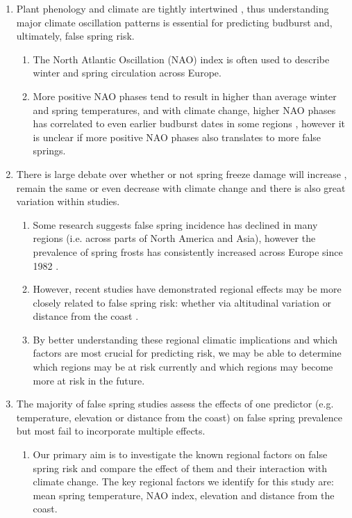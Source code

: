 \documentclass{article}\usepackage[]{graphicx}\usepackage[]{color}
\begin{document}
\begin{enumerate}
\item Plant phenology and climate are tightly intertwined \citep{Wolkovich2011}, thus understanding major climate oscillation patterns is essential for predicting budburst and, ultimately, false spring risk.  
\begin{enumerate}
\item The North Atlantic Oscillation (NAO) index is often used to describe winter and spring circulation across Europe. %
\item More positive NAO phases tend to result in higher than average winter and spring temperatures, and with climate change, higher NAO phases has correlated to even earlier budburst dates in some regions \citep{Chmielewski2001}, however it is unclear if more positive NAO phases also translates to more false springs.
\end{enumerate}

\item There is large debate over whether or not spring freeze damage will increase \citep{Hannenin1991, Augspurger2013, Labe2016}, remain the same \citep{Scheifinger2003} or even decrease \citep{Kramer1994, Vitra2017} with climate change and there is also great variation within studies. %
\begin{enumerate}
\item Some research suggests false spring incidence has declined in many regions (i.e. across parts of North America and Asia), however the prevalence of spring frosts has consistently increased across Europe since 1982 \citep{Liu2018}.
\item However, recent studies have demonstrated regional effects may be more closely related to false spring risk: whether via altitudinal variation \citep{Vitra2017, Ma2018} or distance from the coast \citep{Wypych2016a, Ma2018}.
\item By better understanding these regional climatic implications and which factors are most crucial for predicting risk, we may be able to determine which regions may be at risk currently and which regions may become more at risk in the future.
\end{enumerate}

\item The majority of false spring studies assess the effects of one predictor (e.g. temperature, elevation or distance from the coast) on false spring prevalence but most fail to incorporate multiple effects. 
\begin{enumerate}
\item Our primary aim is to investigate the known regional factors on false spring risk and compare the effect of them and their interaction with climate change. The key regional factors we identify for this study are: mean spring temperature, NAO index, elevation and distance from the coast.
\end{enumerate}


\end{enumerate}
\end{document}
